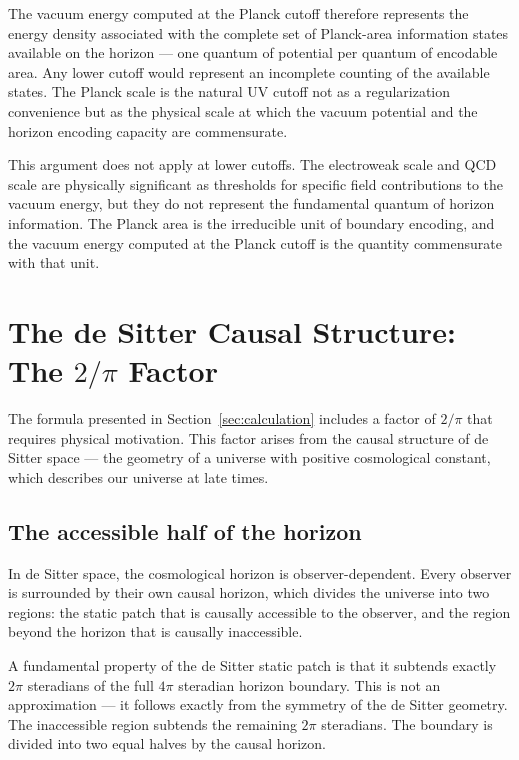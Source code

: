 \documentclass[12pt,a4paper]{article}
\begin{document}
The vacuum energy computed at the Planck cutoff therefore represents the
energy density associated with the complete set of Planck-area information
states available on the horizon — one quantum of potential per quantum of
encodable area. Any lower cutoff would represent an incomplete counting of
the available states. The Planck scale is the natural UV cutoff not as a
regularization convenience but as the physical scale at which the vacuum
potential and the horizon encoding capacity are commensurate.

This argument does not apply at lower cutoffs. The electroweak scale and
QCD scale are physically significant as thresholds for specific field
contributions to the vacuum energy, but they do not represent the
fundamental quantum of horizon information. The Planck area is the
irreducible unit of boundary encoding, and the vacuum energy computed at
the Planck cutoff is the quantity commensurate with that unit.

\section{The de Sitter Causal Structure: The $2/\pi$ Factor}
\label{sec:desitter}

The formula presented in Section~\ref{sec:calculation} includes a factor
of $2/\pi$ that requires physical motivation. This factor arises from the
causal structure of de Sitter space — the geometry of a universe with
positive cosmological constant, which describes our universe at late times.

\subsection{The accessible half of the horizon}

In de Sitter space, the cosmological horizon is observer-dependent. Every
observer is surrounded by their own causal horizon, which divides the
universe into two regions: the static patch that is causally accessible to
the observer, and the region beyond the horizon that is causally
inaccessible.

A fundamental property of the de Sitter static patch is that it subtends
exactly $2\pi$ steradians of the full $4\pi$ steradian horizon boundary.
This is not an approximation — it follows exactly from the symmetry of the
de Sitter geometry. The inaccessible region subtends the remaining $2\pi$
steradians. The boundary is divided into two equal halves by the causal
horizon.
\end{document}
